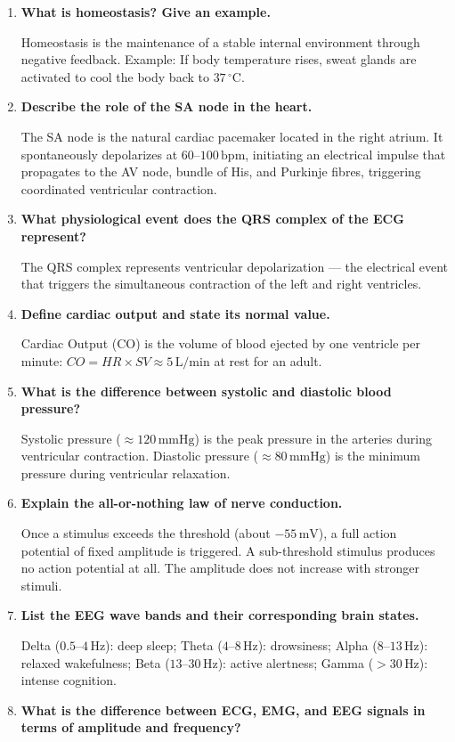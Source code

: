 \documentclass[12pt,a4paper]{article}
\newcommand{\Q}[1]{\textbf{#1}\par\noindent\ignorespaces}
\begin{document}
\begin{tcolorbox}[exambox, title={\textbf{Frequently Asked / Viva Questions}}]
\begin{enumerate}[topsep=0pt, label=\textbf{Q\arabic*.}, itemsep=5pt]
  \item \Q{What is homeostasis? Give an example.}
    Homeostasis is the maintenance of a stable internal environment through negative feedback. Example: If body temperature rises, sweat glands are activated to cool the body back to $37\,^{\circ}\text{C}$.
  \item \Q{Describe the role of the SA node in the heart.}
    The SA node is the natural cardiac pacemaker located in the right atrium. It spontaneously depolarizes at $60$--$100\,\text{bpm}$, initiating an electrical impulse that propagates to the AV node, bundle of His, and Purkinje fibres, triggering coordinated ventricular contraction.
  \item \Q{What physiological event does the QRS complex of the ECG represent?}
    The QRS complex represents ventricular depolarization --- the electrical event that triggers the simultaneous contraction of the left and right ventricles.
  \item \Q{Define cardiac output and state its normal value.}
    Cardiac Output (CO) is the volume of blood ejected by one ventricle per minute: $CO = HR \times SV \approx 5\,\text{L/min}$ at rest for an adult.
  \item \Q{What is the difference between systolic and diastolic blood pressure?}
    Systolic pressure ($\approx 120\,\text{mmHg}$) is the peak pressure in the arteries during ventricular contraction. Diastolic pressure ($\approx 80\,\text{mmHg}$) is the minimum pressure during ventricular relaxation.
  \item \Q{Explain the all-or-nothing law of nerve conduction.}
    Once a stimulus exceeds the threshold (about $-55\,\text{mV}$), a full action potential of fixed amplitude is triggered. A sub-threshold stimulus produces no action potential at all. The amplitude does not increase with stronger stimuli.
  \item \Q{List the EEG wave bands and their corresponding brain states.}
    Delta ($0.5$--$4\,\text{Hz}$): deep sleep; Theta ($4$--$8\,\text{Hz}$): drowsiness; Alpha ($8$--$13\,\text{Hz}$): relaxed wakefulness; Beta ($13$--$30\,\text{Hz}$): active alertness; Gamma ($>30\,\text{Hz}$): intense cognition.
  \item \Q{What is the difference between ECG, EMG, and EEG signals in terms of amplitude and frequency?}

\end{enumerate}
\end{tcolorbox}
\end{document}
